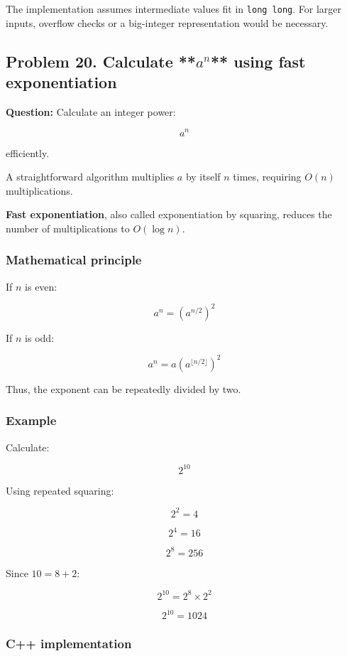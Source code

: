 The implementation assumes intermediate values fit in \texttt{long long}. For larger inputs, overflow checks or a big-integer representation would be necessary.

\subsection{Problem 20. Calculate **$a^n$** using fast exponentiation}

\textbf{Question:} Calculate an integer power:


\[
a^n
\]


efficiently.

A straightforward algorithm multiplies $a$ by itself $n$ times, requiring $O(n)$ multiplications.

\textbf{Fast exponentiation}, also called exponentiation by squaring, reduces the number of multiplications to $O(\log n)$.

\subsubsection{Mathematical principle}

If $n$ is even:


\[
\boxed{a^n=(a^{n/2})^2}
\]


If $n$ is odd:


\[
\boxed{a^n=a(a^{\lfloor n/2\rfloor})^2}
\]


Thus, the exponent can be repeatedly divided by two.

\subsubsection{Example}

Calculate:


\[
2^{10}
\]


Using repeated squaring:


\[
2^2=4
\]



\[
2^4=16
\]



\[
2^8=256
\]


Since $10=8+2$:


\[
2^{10}=2^8\times2^2
\]



\[
\boxed{2^{10}=1024}
\]


\subsubsection{C++ implementation}

